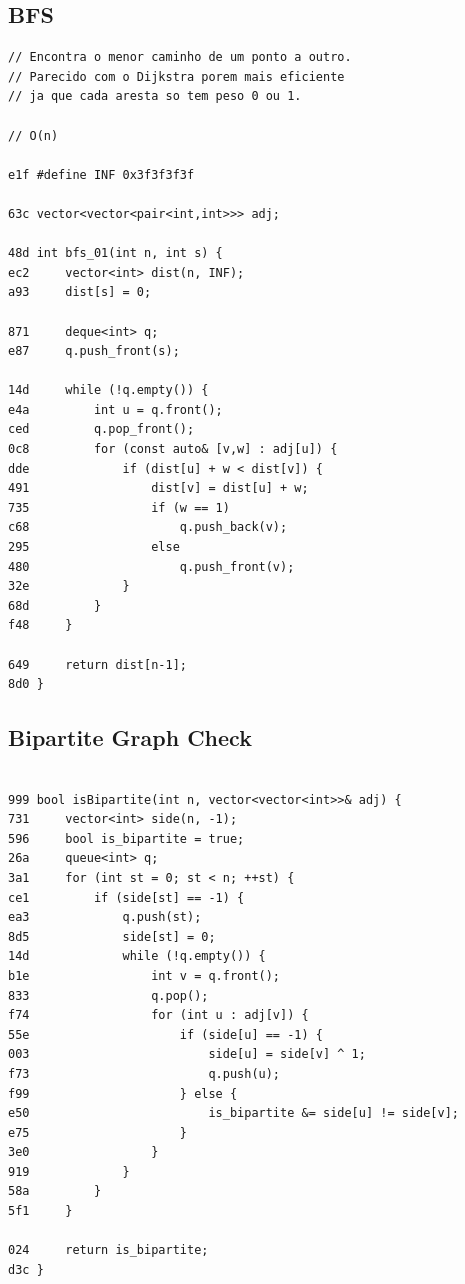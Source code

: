 \documentclass[11pt, a4paper, twoside]{article}
\begin{document}
\subsection{BFS}
\begin{lstlisting}
// Encontra o menor caminho de um ponto a outro.
// Parecido com o Dijkstra porem mais eficiente
// ja que cada aresta so tem peso 0 ou 1.

// O(n)

e1f #define INF 0x3f3f3f3f

63c vector<vector<pair<int,int>>> adj;

48d int bfs_01(int n, int s) {
ec2     vector<int> dist(n, INF);
a93     dist[s] = 0;
    
871     deque<int> q;
e87     q.push_front(s);
    
14d     while (!q.empty()) {
e4a         int u = q.front();
ced         q.pop_front();
0c8         for (const auto& [v,w] : adj[u]) {
dde             if (dist[u] + w < dist[v]) {
491                 dist[v] = dist[u] + w;
735                 if (w == 1)
c68                     q.push_back(v);
295                 else
480                     q.push_front(v);
32e             }
68d         }
f48     }
    
649     return dist[n-1];
8d0 }
\end{lstlisting}

\subsection{Bipartite Graph Check}
\begin{lstlisting}

999 bool isBipartite(int n, vector<vector<int>>& adj) {
731     vector<int> side(n, -1);
596     bool is_bipartite = true;
26a     queue<int> q;
3a1     for (int st = 0; st < n; ++st) {
ce1         if (side[st] == -1) {
ea3             q.push(st);
8d5             side[st] = 0;
14d             while (!q.empty()) {
b1e                 int v = q.front();
833                 q.pop();
f74                 for (int u : adj[v]) {
55e                     if (side[u] == -1) {
003                         side[u] = side[v] ^ 1;
f73                         q.push(u);
f99                     } else {
e50                         is_bipartite &= side[u] != side[v];
e75                     }
3e0                 }
919             }
58a         }
5f1     }
    
024     return is_bipartite;
d3c }
\end{lstlisting}
\end{document}
